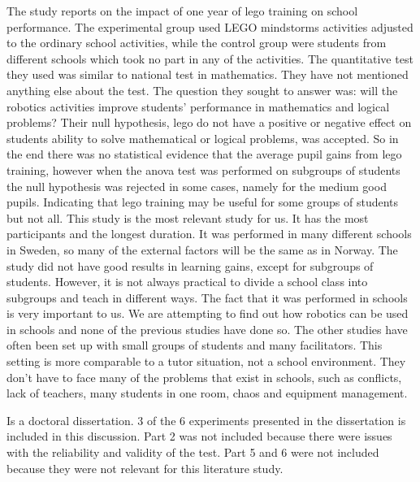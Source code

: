 \bigskip\noindent
\cite{lindh2007does} The study reports on the impact of one year of lego training on school performance. The experimental group used LEGO mindstorms activities adjusted to the ordinary school activities, while the control group were students from different schools which took no part in any of the activities. The quantitative test they used was similar to national test in mathematics. They have not mentioned anything else about the test. The question they sought to answer was: will the robotics activities improve students' performance in mathematics and logical problems? Their null hypothesis, lego do not have a positive or negative effect on students ability to solve mathematical or logical problems, was accepted. So in the end there was no statistical evidence that the average pupil gains from lego training, however when the anova test was performed on subgroups of students the null hypothesis was rejected in some cases, namely for the medium good pupils. Indicating that lego training may be useful for some groups of students but not all. This study is the most relevant study for us. It has the most participants and the longest duration. It was performed in many different schools in Sweden, so many of the external factors will be the same as in Norway. The study did not have good results in learning gains, except for subgroups of students. However, it is not always practical to divide a school class into subgroups and teach in different ways. The fact that it was performed in schools is very important to us. We are attempting to find out how robotics can be used in schools and none of the previous studies have done so. The other studies have often been set up with small groups of students and many facilitators. This setting is more comparable to a tutor situation, not a school environment. They don't have to face many of the problems that exist in schools, such as conflicts, lack of teachers, many students in one room, chaos and equipment management. 

\bigskip\noindent
\cite{silk2011resources} Is a doctoral dissertation. 3 of the 6 experiments presented in the dissertation is included in this discussion. Part 2 was not included because there were issues with the reliability and validity of the test. Part 5 and 6 were not included because they were not relevant for this literature study.

